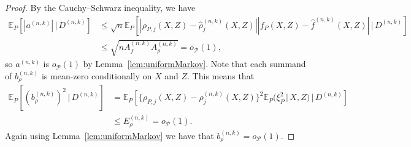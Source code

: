 \documentclass[aos]{imsart}
\newcommand{\E}{\mathbb{E}}
\newcommand{\given}{\,|\,}
\begin{document}
\begin{proof}
		By the Cauchy--Schwarz inequality, we have
		\begin{align*}
			\E_P[|a^{(n,k)}|\given  D^{(n,k)}] &\leq  \sqrt{n} \E_P[|\rho_{P,j}(X,Z)-\hat\rho_j^{(n,k)}(X,Z)||f_P(X,Z)-\hat f^{(n,k)}(X,Z)|\given  D^{(n,k)}]\\
			&\leq \sqrt{n A_f^{(n,k)}A_\rho^{(n,k)}} =o_{\mathcal{P}}(1),
		\end{align*}
		so $a^{(n,k)}$ is $o_{\mathcal{P}}(1)$ by Lemma~\ref{lem:uniformMarkov}. Note that each summand of $b^{(n,k)}_\rho$ is mean-zero conditionally on $X$ and $Z$. This means that
		\begin{align*}
			\E_P[(b^{(n,k)}_\rho)^2\given  D^{(n,k)}]&=\E_P[\{\rho_{P,j}(X,Z)-\hat \rho^{(n,k)}_j(X,Z)\}^2 \E_P(\xi_P^2 \given  X,Z)\given  D^{(n,k)}]\\
			&\leq E_\rho^{(n,k)}=o_{\mathcal{P}}(1).
		\end{align*}
		Again using Lemma~\ref{lem:uniformMarkov} we have that $b^{(n,k)}_\rho = o_\mathcal{P}(1)$.
		

\end{proof}
\end{document}
